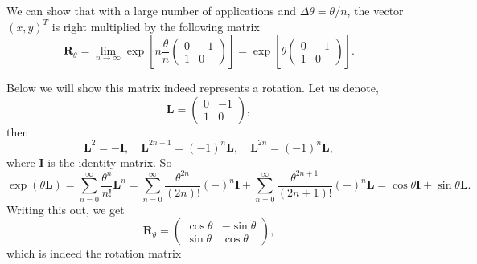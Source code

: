 \documentclass{article}
\begin{document}
%
We can show that with a large number of applications
and $\Delta \theta = \theta / n$,
the vector $(x, y)^T$ is right multiplied by the following matrix
$$
\mathbf R_\theta
=
\lim_{n\rightarrow \infty}
\exp\left[
  n \frac{ \theta } { n }
\left(
  \begin{array}{ccc}
    0 & -1 \\
    1 & 0
  \end{array}
\right)\right]
=
\exp\left[
  \theta
\left(
  \begin{array}{ccc}
    0 & -1 \\
    1 & 0
  \end{array}
\right)\right].
$$

Below we will show this matrix indeed represents
a rotation.
Let us denote,
$$
\mathbf L
=
\left(
  \begin{array}{ccc}
    0 & -1 \\
    1 & 0
  \end{array}
\right),
$$
then
$$
\mathbf L^2 = -\mathbf I, \quad
\mathbf L^{2n+1} = (-1)^n \mathbf L, \quad
\mathbf L^{2n} = (-1)^n \mathbf L,
$$
where $\mathbf I$ is the identity matrix.
So
$$
\exp(\theta \mathbf L)
=
\sum_{n = 0}^\infty \frac{\theta^n}{n!} \mathbf L^n
=
\sum_{n = 0}^\infty \frac{\theta^{2n}}{(2n)!} (-)^n \mathbf I
+
\sum_{n = 0}^\infty \frac{\theta^{2n+1}}{(2n+1)!} (-)^n \mathbf L
=
\cos\theta \mathbf I
+
\sin \theta \mathbf L.
$$
Writing this out, we get
$$
\mathbf R_\theta
=
\left(
  \begin{array}{ccc}
    \cos \theta & -\sin \theta \\
    \sin \theta & \cos \theta
  \end{array}
\right),
$$
which is indeed the rotation matrix



\end{document}
